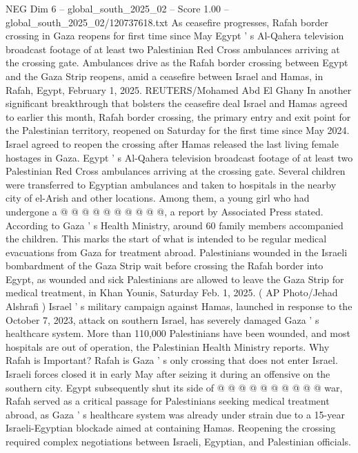 \begin{textsample}{NEG Dim 6 – global\_south\_2025\_02 – Score 1.00 – global\_south\_2025\_02/120737618.txt}  \label{ex:f6_neg_038}
As ceasefire progresses, Rafah border crossing in Gaza reopens for first time since May Egypt ' s Al-Qahera television broadcast footage of at least two Palestinian Red Cross ambulances arriving at the crossing gate.
Ambulances drive as the Rafah border crossing between Egypt and the Gaza Strip reopens, amid a ceasefire between Israel and Hamas, in Rafah, Egypt, February 1, 2025.
REUTERS/Mohamed Abd El Ghany In another significant breakthrough that bolsters the ceasefire deal Israel and Hamas agreed to earlier this month, Rafah border crossing, the primary entry and exit point for the Palestinian territory, reopened on Saturday for the first time since May 2024.
Israel agreed to reopen the crossing after Hamas released the last living female hostages in Gaza.
Egypt ' s Al-Qahera television broadcast footage of at least two Palestinian Red Cross ambulances arriving at the crossing gate.
Several children were transferred to Egyptian ambulances and taken to hospitals in the nearby city of el-Arish and other locations.
Among them, a young girl who had undergone a @ @ @ @ @ @ @ @ @ @, a report by Associated Press stated.
According to Gaza ' s Health Ministry, around 60 family members accompanied the children.
This marks the start of what is intended to be regular medical evacuations from Gaza for treatment abroad.
Palestinians wounded in the Israeli bombardment of the Gaza Strip wait before crossing the Rafah border into Egypt, as wounded and sick Palestinians are allowed to leave the Gaza Strip for medical treatment, in Khan Younis, Saturday Feb. 1, 2025. ( AP Photo/Jehad Alshrafi ) Israel ' s military campaign against Hamas, launched in response to the October 7, 2023, attack on southern Israel, has severely damaged Gaza ' s healthcare system.
More than 110,000 Palestinians have been wounded, and most hospitals are out of operation, the Palestinian Health Ministry reports.
Why Rafah is Important?
Rafah is Gaza ' s only crossing that does not enter Israel.
Israeli forces closed it in early May after seizing it during an offensive on the southern city.
Egypt subsequently shut its side of @ @ @ @ @ @ @ @ @ @ war, Rafah served as a critical passage for Palestinians seeking medical treatment abroad, as Gaza ' s healthcare system was already under strain due to a 15-year Israeli-Egyptian blockade aimed at containing Hamas.
Reopening the crossing required complex negotiations between Israeli, Egyptian, and Palestinian officials.

\end{textsample}
